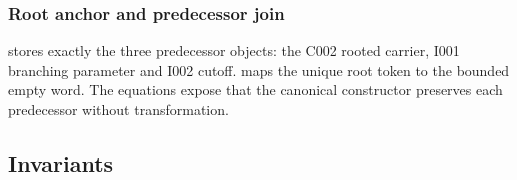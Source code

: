 \subsubsection{Root anchor and predecessor
join}\label{root-anchor-and-predecessor-join}

\texttt{\protect{}} stores exactly the three
predecessor objects: the C002 rooted carrier, I001 branching parameter
and I002 cutoff. \texttt{\protect{}} maps the unique root token to the
bounded empty word. The \texttt{\protect{}} equations expose that the
canonical constructor preserves each predecessor without transformation.

\subsection{Invariants}\label{invariants-1}

